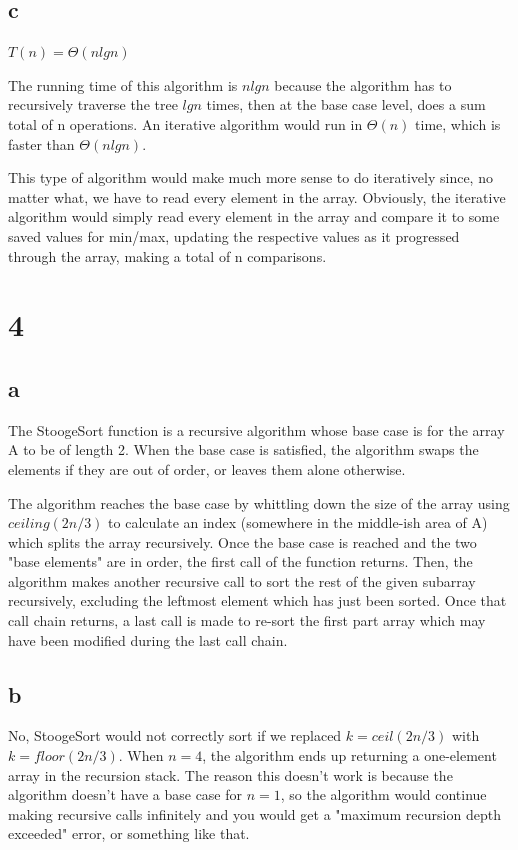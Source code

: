\documentclass[10pt,a4paper]{report}
\begin{document}
	\subsection*{c}
	$T(n) = \Theta(n lg n)$
	
	The running time of this algorithm is $n lg n$ because the algorithm has to recursively traverse the tree $lg n$ times, then at the base case level, does a sum total of n operations. An iterative algorithm would run in $\Theta(n)$ time, which is faster than $\Theta(n lg n)$. 
	
	This type of algorithm would make much more sense to do iteratively since, no matter what, we have to read every element in the array. Obviously, the iterative algorithm would simply read every element in the array and compare it to some saved values for min/max, updating the respective values as it progressed through the array, making a total of n comparisons.
	
	\newpage
	\section*{4}
	\subsection*{a}
	The StoogeSort function is a recursive algorithm whose base case is for the array A to be of length 2. When the base case is satisfied, the algorithm swaps the elements if they are out of order, or leaves them alone otherwise.
	
	The algorithm reaches the base case by whittling down the size of the array using $ceiling(2n/3)$ to calculate an index (somewhere in the middle-ish area of A) which splits the array recursively. Once the base case is reached and the two "base elements" are in order, the first call of the function returns. Then, the algorithm makes another recursive call to sort the rest of the given subarray recursively, excluding the leftmost element which has just been sorted. Once that call chain returns, a last call is made to re-sort the first part array which may have been modified during the last call chain.
	
	\subsection*{b}
	No, StoogeSort would not correctly sort if we replaced $k=ceil(2n/3)$ with $k=floor(2n/3)$. When $n = 4$, the algorithm ends up returning a one-element array in the recursion stack. The reason this doesn't work is because the algorithm doesn't have a base case for $n = 1$, so the algorithm would continue making recursive calls infinitely and you would get a "maximum recursion depth exceeded" error, or something like that.
	
\end{document}
